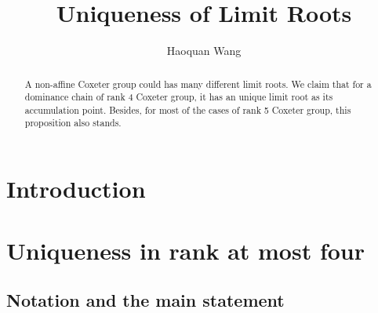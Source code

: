 \documentclass[11pt,reqno]{amsart}
\title[Uniqueness of Limit Roots]
{Uniqueness of Limit Roots}
\author{Haoquan Wang}
\theoremstyle{plain}
\theoremstyle{definition}
\theoremstyle{remark}
\numberwithin{equation}{section}
\begin{document}

\begin{abstract}
A non-affine Coxeter group could has many different limit roots. We claim that for a dominance chain of rank 4 Coxeter group, it has an unique limit root as its accumulation point. Besides, for most of the cases of rank 5 Coxeter group, this proposition also stands. 
\end{abstract}

\maketitle


\tableofcontents
\section{Introduction}
\label{sec:introduction}


\section{Uniqueness in rank at most four}\label{sec:rank-four}
\subsection{Notation and the main statement}
\end{document}
